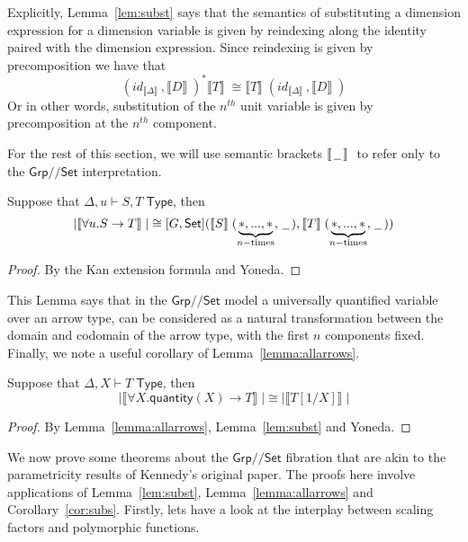 \documentclass[a4paper,UKenglish]{lipics}
\newcommand{\msf}[1]{\mathsf{#1}} %
\newcommand{\Grp}{\msf{Grp}}
\newcommand{\Set}{\msf{Set}}
\newcommand{\blank}{\, \underline{\hspace{2mm}} \,}
\newcommand{\GroupSet}[1]{[#1,\Set]}
\newcommand{\Lslice}[1]{#1/\!/\Set}
\newcommand{\GrpSet}{\Lslice{\Grp}}
\newcommand{\sem}[1]{\ensuremath{\llbracket #1 \rrbracket} \;}
\newcommand{\qnt}{\msf{quantity}}
\begin{document}
Explicitly, Lemma~\ref{lem:subst} says that the semantics of substituting a dimension expression for a dimension variable is given by reindexing along the identity paired with the dimension expression. Since reindexing is given by precomposition we have that
\[
 (id_{\sem{\Delta}} , \sem{D})^\ast \sem{T} \cong \sem{T}(id_{\sem{\Delta}}, \sem{D})
\]
Or in other words, substitution of the $n^{th}$ unit variable is given by precomposition at the $n^{th}$ component.

For the rest of this section, we will use semantic brackets $\sem{\, \underline{\hspace{2mm}}\, }$ to refer only to the $\GrpSet$ interpretation.

\begin{lemma}
\label{lemma:allarrows}
 Suppose that $\Delta, u \vdash S,T \; \msf{ Type}$, then
\[
|\sem{\forall u. S \rightarrow T}| \cong \GroupSet{G} (\sem{S}(\underbrace{\ast,...,\ast}_{n-\text{times}}, \blank),\sem{T}(\underbrace{\ast,...,\ast}_{n-\text{times}}, \blank))
\]
\end{lemma}
\begin{proof}
By the Kan extension formula and Yoneda.
\end{proof}

This Lemma says that in the $\GrpSet$ model a universally quantified variable over an arrow type, can be considered as a natural transformation between the domain and codomain of the arrow type, with the first $n$ components fixed. Finally, we note a useful corollary of Lemma~\ref{lemma:allarrows}.
\begin{corollary}
\label{cor:subs}
Suppose that $\Delta, X \vdash T \; \msf{ Type}$, then
 \[
  |\sem{\forall X . \qnt(X) \rightarrow T}| \cong |\sem{T[1/X]}|
\]
\end{corollary}
\begin{proof}
 By Lemma~\ref{lemma:allarrows}, Lemma~\ref{lem:subst} and Yoneda.
\end{proof}



We now prove some theorems about the $\GrpSet$ fibration that are akin to the parametricity results of Kennedy's original paper. The proofs here involve applications of Lemma~\ref{lem:subst}, Lemma~\ref{lemma:allarrows} and Corollary~\ref{cor:subs}. Firstly, lets have a look at the interplay between scaling factors and polymorphic functions.
\end{document}
